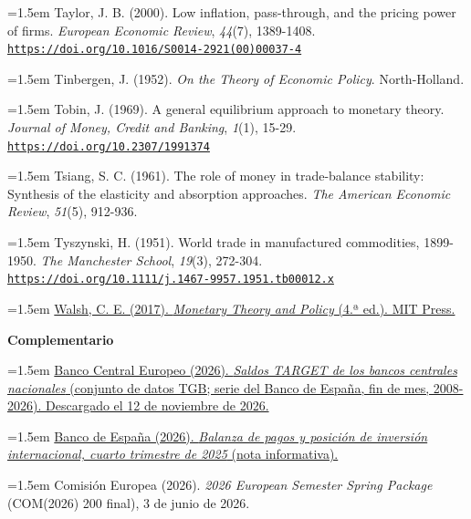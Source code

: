 \documentclass[10pt,a4paper]{article}
\begin{document}
\noindent\hangindent=1.5em Taylor, J. B. (2000). Low inflation, pass-through, and the pricing power of firms. \textit{European Economic Review}, \textit{44}(7), 1389-1408. \href{https://doi.org/10.1016/S0014-2921(00)00037-4}{\nolinkurl{https://doi.org/10.1016/S0014-2921(00)00037-4}}

\noindent\hangindent=1.5em Tinbergen, J. (1952). \textit{On the Theory of Economic Policy}. North-Holland.

\noindent\hangindent=1.5em Tobin, J. (1969). A general equilibrium approach to monetary theory. \textit{Journal of Money, Credit and Banking}, \textit{1}(1), 15-29. \href{https://doi.org/10.2307/1991374}{\nolinkurl{https://doi.org/10.2307/1991374}}

\noindent\hangindent=1.5em Tsiang, S. C. (1961). The role of money in trade-balance stability: Synthesis of the elasticity and absorption approaches. \textit{The American Economic Review}, \textit{51}(5), 912-936.

\noindent\hangindent=1.5em Tyszynski, H. (1951). World trade in manufactured commodities, 1899-1950. \textit{The Manchester School}, \textit{19}(3), 272-304. \href{https://doi.org/10.1111/j.1467-9957.1951.tb00012.x}{\nolinkurl{https://doi.org/10.1111/j.1467-9957.1951.tb00012.x}}

\noindent\hangindent=1.5em \href{https://mitpress.mit.edu/books/monetary-theory-and-policy-fourth-edition}{Walsh, C. E. (2017). \textit{Monetary Theory and Policy} (4.ª ed.). MIT Press.}

\vspace{0.8em}
\textbf{Complementario}

\noindent\hangindent=1.5em \href{https://data.ecb.europa.eu/}{Banco Central Europeo (2026). \textit{Saldos TARGET de los bancos centrales nacionales} (conjunto de datos TGB; serie del Banco de España, fin de mes, 2008-2026). Descargado el 12 de noviembre de 2026.}

\noindent\hangindent=1.5em \href{https://www.bde.es/wbe/es/noticias-eventos/actualidad-banco-espana/notas-banco-espana/bop-pii-4t2025.html}{Banco de España (2026). \textit{Balanza de pagos y posición de inversión internacional, cuarto trimestre de 2025} (nota informativa).}

\noindent\hangindent=1.5em Comisión Europea (2026). \textit{2026 European Semester Spring Package} (COM(2026) 200 final), 3 de junio de 2026.
\end{document}
